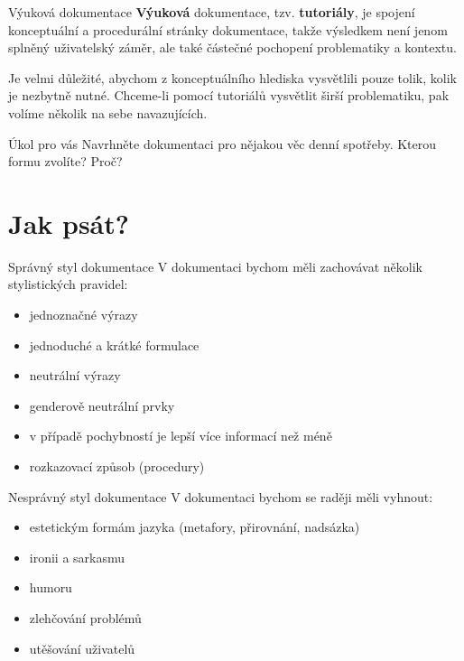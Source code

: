 \documentclass[12pt]{beamer}
\begin{document}
  	\begin{frame}{Výuková dokumentace}
		\textbf{Výuková} dokumentace, tzv. \textbf{tutoriály}, je spojení konceptuální a procedurální stránky dokumentace, takže výsledkem není jenom splněný uživatelský záměr, ale také částečné pochopení problematiky a kontextu.
		
		\vspace{5pt}
		
		Je velmi důležité, abychom z konceptuálního hlediska vysvětlili pouze tolik, kolik je nezbytně nutné. Chceme-li pomocí tutoriálů vysvětlit širší problematiku, pak volíme několik na sebe navazujících.	
	\end{frame}

	\begin{frame}{Úkol pro vás}
	Navrhněte dokumentaci pro nějakou věc denní spotřeby. Kterou formu zvolíte? Proč?
	\end{frame}

	\section{Jak psát?}

	\begin{frame}{Správný styl dokumentace}
	V dokumentaci bychom měli zachovávat několik stylistických pravidel:
	\begin{itemize}
		\item jednoznačné výrazy
		\item jednoduché a krátké formulace
		\item neutrální výrazy
		\item genderově neutrální prvky
		\item v případě pochybností je lepší více informací než méně
		\item rozkazovací způsob (procedury)
	\end{itemize}
	\end{frame}

	\begin{frame}{Nesprávný styl dokumentace}
	V dokumentaci bychom se raději měli vyhnout:
	\begin{itemize}
		\item estetickým formám jazyka (metafory, přirovnání, nadsázka)
		\item ironii a sarkasmu
		\item humoru
		\item zlehčování problémů
		\item utěšování uživatelů
	\end{itemize}
	\end{frame}
\end{document}
